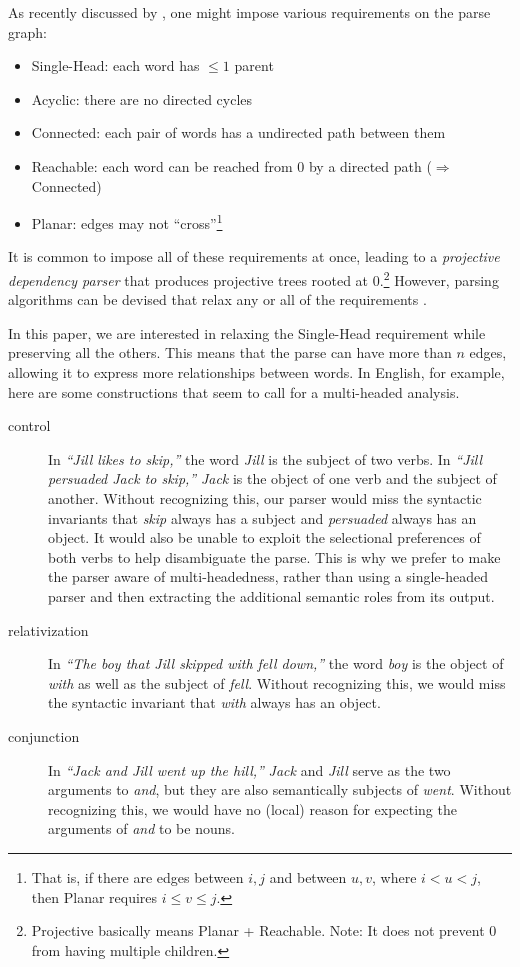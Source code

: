 \documentclass[11pt]{article}
\begin{document}
As recently discussed by , one might impose various requirements on the parse graph:
\begin{itemize}[noitemsep]
\item {\sc Single-Head}: each word has $\leq 1$ parent
\item {\sc Acyclic}: there are no directed cycles
\item {\sc Connected}: each pair of words has a undirected path between them
\item {\sc Reachable}: each word can be reached from 0 by a directed path ($\Rightarrow$ {\sc Connected})
\item {\sc Planar}: edges may not ``cross''\footnote{That is, if there are edges between $i,j$ and between $u,v$, where $i < u < j$, then {\sc Planar} requires $i \leq v \leq j$.}
\end{itemize}
It is common to impose all of these requirements at once, leading to a {\em projective dependency parser} that produces projective trees rooted at 0.\footnote{{\sc Projective} basically means {\sc Planar} + {\sc Reachable}.  Note: It does not prevent 0 from having multiple children.}  However, parsing algorithms can be devised that relax any or all of the requirements \cite{gomezrodriguez-nivre-2013}.  

In this paper, we are interested in relaxing the {\sc Single-Head} requirement while preserving all the others.  This means that the parse can have more than $n$ edges, allowing it to express more relationships between words.  In English, for example, here are some constructions that seem to call for a multi-headed analysis.  
\begin{description}
\item[control] In {\em ``Jill likes to skip,''} the word {\em Jill} is the subject of two verbs.  In {\em ``Jill persuaded Jack to skip,''} {\em Jack} is the object of one verb and the subject of another.  Without recognizing this, our parser would miss the syntactic invariants that {\em skip} always has a subject and {\em persuaded} always has an object.  It would also be unable to exploit the selectional preferences of both verbs to help disambiguate the parse.  This is why we prefer to make the parser aware of multi-headedness, rather than using a single-headed parser and then extracting the additional semantic roles from its output.
\item[relativization] In {\em ``The boy that Jill skipped with fell down,''} the word {\em boy} is the object of {\em with} as well as the subject of {\em fell}.  Without recognizing this, we would miss the syntactic invariant that {\em with} always has an object.  
\item[conjunction] In {\em ``Jack and Jill went up the hill,''} {\em Jack} and {\em Jill} serve as the two arguments to {\em and}, but they are also semantically subjects of {\em went}.  Without recognizing this, we would have no (local) reason for expecting the arguments of {\em and} to be nouns.
\end{description}
\end{document}
